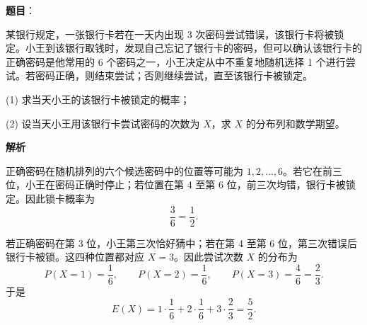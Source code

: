 \begin{answer}

\textbf{题目}：

某银行规定，一张银行卡若在一天内出现 3 次密码尝试错误，该银行卡将被锁定。小王到该银行取钱时，发现自己忘记了银行卡的密码，但可以确认该银行卡的正确密码是他常用的 6 个密码之一，小王决定从中不重复地随机选择 1 个进行尝试。若密码正确，则结束尝试；否则继续尝试，直至该银行卡被锁定。

(1) 求当天小王的该银行卡被锁定的概率；

(2) 设当天小王用该银行卡尝试密码的次数为 $X$，求 $X$ 的分布列和数学期望。

\textbf{解析}


正确密码在随机排列的六个候选密码中的位置等可能为 $1,2,\ldots,6$。若它在前三位，小王在密码正确时停止；若位置在第 4 至第 6 位，前三次均错，银行卡被锁定。因此锁卡概率为
\nopagebreak[4]
\[
\frac{3}{6}=\frac12.
\]


若正确密码在第 3 位，小王第三次恰好猜中；若在第 4 至第 6 位，第三次错误后银行卡被锁。这四种位置都对应 $X=3$。因此尝试次数 $X$ 的分布为
\nopagebreak[4]
\[
P(X=1)=\frac16,\qquad P(X=2)=\frac16,\qquad P(X=3)=\frac46=\frac23.
\]
于是
\nopagebreak[4]
\[
E(X)=1\cdot\frac16+2\cdot\frac16+3\cdot\frac23=\frac52.
\]



\end{answer}
